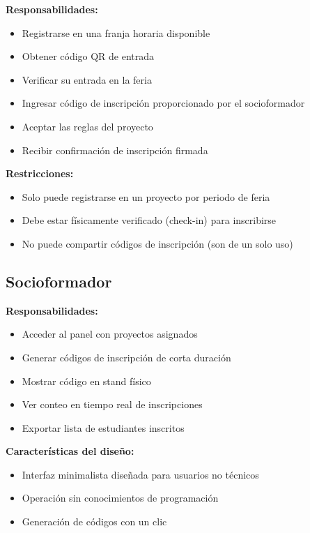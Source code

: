 \documentclass[12pt,a4paper]{article}
\begin{document}
\textbf{Responsabilidades:}
\begin{itemize}[leftmargin=*]
    \item Registrarse en una franja horaria disponible
    \item Obtener código QR de entrada
    \item Verificar su entrada en la feria
    \item Ingresar código de inscripción proporcionado por el socioformador
    \item Aceptar las reglas del proyecto
    \item Recibir confirmación de inscripción firmada
\end{itemize}

\textbf{Restricciones:}
\begin{itemize}[leftmargin=*]
    \item Solo puede registrarse en un proyecto por periodo de feria
    \item Debe estar físicamente verificado (check-in) para inscribirse
    \item No puede compartir códigos de inscripción (son de un solo uso)
\end{itemize}

\subsection{Socioformador}

\textbf{Responsabilidades:}
\begin{itemize}[leftmargin=*]
    \item Acceder al panel con proyectos asignados
    \item Generar códigos de inscripción de corta duración
    \item Mostrar código en stand físico
    \item Ver conteo en tiempo real de inscripciones
    \item Exportar lista de estudiantes inscritos
\end{itemize}

\textbf{Características del diseño:}
\begin{itemize}[leftmargin=*]
    \item Interfaz minimalista diseñada para usuarios no técnicos
    \item Operación sin conocimientos de programación
    \item Generación de códigos con un clic
\end{itemize}
\end{document}
